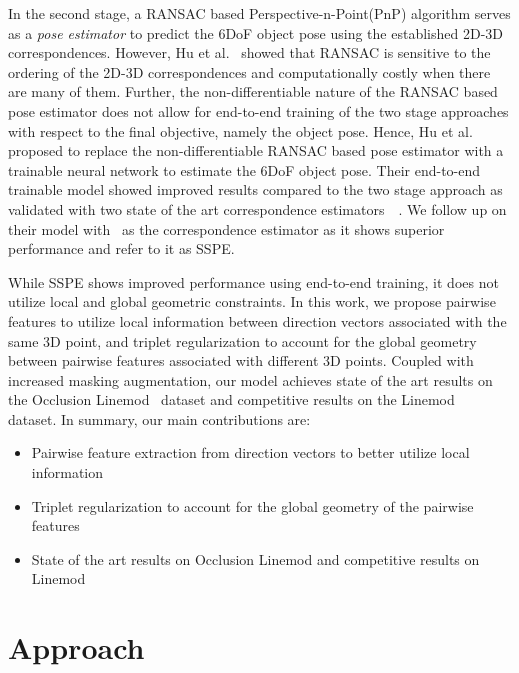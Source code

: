 \documentclass{article}
\begin{document}
In the second stage, a RANSAC based Perspective-n-Point(PnP) algorithm serves as a \textit{pose estimator} to predict the 6DoF object pose using the established 2D-3D correspondences. However, Hu et al.~\cite{hu2020single} showed that RANSAC is sensitive to the ordering of the 2D-3D correspondences and computationally costly when there are many of them. Further, the non-differentiable nature of the RANSAC based pose estimator 
does not allow for end-to-end training of the two stage approaches with respect to the final objective, namely the object pose. Hence, Hu et al.~\cite{hu2020single} proposed to replace the non-differentiable RANSAC based pose estimator with a trainable neural network to estimate the 6DoF object pose. Their end-to-end trainable model showed improved results compared to the two stage approach as validated with two state of the art correspondence estimators~\cite{hu2019segmentation}~\cite{peng2019pvnet}. We follow up on their model with~\cite{peng2019pvnet} as the correspondence estimator as it shows superior performance and refer to it as SSPE.





While SSPE shows improved performance using end-to-end training, it does not utilize local and global geometric constraints. In this work, we propose pairwise features to utilize local information between direction vectors associated with the same 3D point, and triplet regularization to account for the global geometry between pairwise features associated with different 3D points.
Coupled with increased masking augmentation, our model achieves state of the art results on the Occlusion Linemod~\cite{occlusionlinemod} dataset and competitive results on the Linemod~\cite{linemod} dataset. In summary, our main contributions are:
\begin{itemize}

    \item Pairwise feature extraction from direction vectors to better utilize local information
    \item Triplet regularization to account for the global geometry of the pairwise features
    \item State of the art results on Occlusion Linemod and competitive results on Linemod 

\end{itemize}


\section{Approach}
\end{document}
